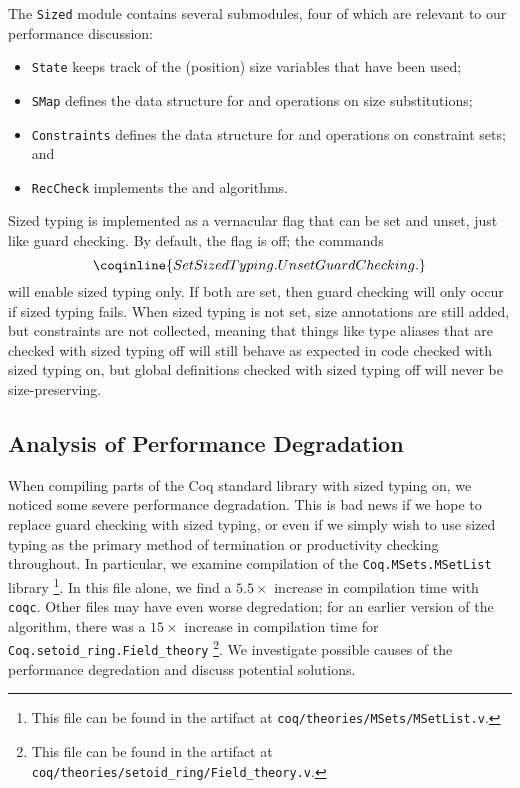 The \texttt{Sized} module contains several submodules, four of which are relevant to our performance discussion:
\begin{itemize}
  \item \texttt{State} keeps track of the (position) size variables that have been used;
  \item \texttt{SMap} defines the data structure for and operations on size substitutions;
  \item \texttt{Constraints} defines the data structure for and operations on constraint sets; and
  \item \texttt{RecCheck} implements the \RecCheck and \solve algorithms.
\end{itemize}

Sized typing is implemented as a vernacular flag that can be set and unset, just like guard checking.
By default, the flag is off; the commands
$$\coqinline{Set Sized Typing. Unset Guard Checking.}$$
will enable sized typing only.
If both are set, then guard checking will only occur if sized typing fails.
When sized typing is not set, size annotations are still added, but constraints are not collected,
meaning that things like type aliases that are checked with sized typing off will still behave as expected in code checked with sized typing on,
but global definitions checked with sized typing off will never be size-preserving.

\subsection{Analysis of Performance Degradation}

When compiling parts of the Coq standard library with sized typing on, we noticed some severe performance degradation.
This is bad news if we hope to replace guard checking with sized typing,
or even if we simply wish to use sized typing as the primary method of termination or productivity checking throughout.
In particular, we examine compilation of the \texttt{Coq.MSets.MSetList} library%
\footnote{This file can be found in the artifact at \texttt{coq/theories/MSets/MSetList.v}.}.
In this file alone, we find a $5.5\times$ increase in compilation time with \texttt{coqc}.
Other files may have even worse degredation; for an earlier version of the algorithm,
there was a $15\times$ increase in compilation time for \texttt{Coq.setoid\_ring.Field\_theory}%
\footnote{This file can be found in the artifact at \texttt{coq/theories/setoid\_ring/Field\_theory.v}.}.
We investigate possible causes of the performance degredation and discuss potential solutions.

